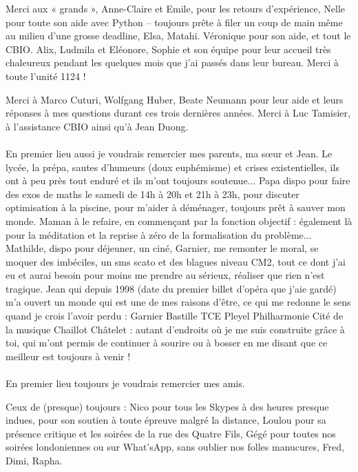 \documentclass[11pt, oneside]{Thesis} %
\begin{document}
{Merci aux « grands », Anne-Claire et Emile, pour les retours d'expérience, Nelle pour toute son aide avec Python – toujours prête à filer un coup de main même au milieu d'une grosse deadline, Elsa, Matahi. Véronique pour son aide, et tout le CBIO. Alix, Ludmila et Eléonore, Sophie et son équipe pour leur accueil très chaleureux pendant les quelques mois que j'ai passés dans leur bureau. Merci à toute l'unité 1124 !

Merci à Marco Cuturi, Wolfgang Huber, Beate Neumann pour leur aide et leurs réponses à mes questions durant ces trois dernières années. Merci à Luc Tamisier, à l'assistance CBIO ainsi qu'à Jean Duong.
\paragraph{}
En premier lieu aussi je voudrais remercier mes parents, ma sœur et Jean. Le lycée, la prépa, sautes d'humeurs (doux euphémisme) et crises existentielles, ils ont à peu près tout enduré et ils m'ont toujours soutenue... Papa dispo pour faire des exos de maths le samedi de 14h à 20h et 21h à 23h, pour discuter optimisation à la piscine, pour m'aider à déménager, toujours prêt à sauver mon monde. Maman à le refaire, en commençant par la fonction objectif : également là pour la méditation et la reprise à zéro de la formalisation du problème... Mathilde, dispo pour déjeuner, un ciné, Garnier, me remonter le moral, se moquer des imbéciles, un sms scato et des blagues niveau CM2, tout ce dont j'ai eu et aurai besoin pour moins me prendre au sérieux, réaliser que rien n'est tragique. Jean qui depuis 1998 (date du premier billet d'opéra que j'aie gardé) m'a ouvert un monde qui est une de mes raisons d'être, ce qui me redonne le sens quand je crois l'avoir perdu : Garnier Bastille TCE Pleyel Philharmonie Cité de la musique Chaillot Châtelet : autant d'endroits où je me suis construite grâce à toi, qui m'ont permis de continuer à sourire ou à bosser en me disant que ce meilleur est toujours à venir !
\paragraph{}
En premier lieu toujours je voudrais remercier mes amis. 

Ceux de (presque) toujours : Nico pour tous les Skypes à des heures presque indues, pour son soutien à toute épreuve malgré la distance, Loulou pour sa présence critique et les soirées de la rue des Quatre Fils, Gégé pour toutes nos soirées londoniennes ou sur What'sApp, sans oublier nos folles manucures, Fred, Dimi, Rapha. 

}
\end{document}
